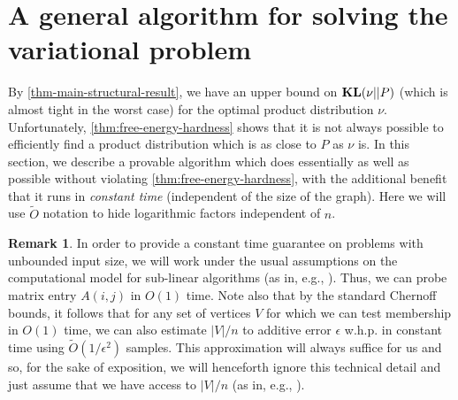\documentclass[final, 12pt]{colt2018}
\newcommand{\KL}{\mathop{\bf KL\/}}
\theoremstyle{definition}
\newtheorem{remark}[theorem]{Remark}
\theoremstyle{plain}
\begin{document}
\section{A general algorithm for solving the variational problem}
By \cref{thm-main-structural-result}, we have an upper bound on $\KL(\nu || P)$ (which is almost tight in the worst case) for the optimal product distribution $\nu$. Unfortunately, \cref{thm:free-energy-hardness} shows that it is not always possible to efficiently find a product distribution which is as close to $P$ as $\nu$ is. In this section, we describe a provable algorithm which does essentially as well as possible without violating \cref{thm:free-energy-hardness}, with the additional benefit that it runs in \emph{constant time} (independent of the size of the graph). Here we will use $\tilde{O}$ notation to hide logarithmic factors independent of $n$.

\begin{remark}
\label{rmk:constant-time-assumptions}
In order to provide a constant time guarantee on problems with unbounded input size, we will work under the usual assumptions on the computational model for sub-linear algorithms (as in, e.g., \citet{alon-etal-samplingCSP-conference,frieze-kannan-matrix,indyk1999sublinear}). Thus, we can probe matrix entry $A(i,j)$ in $O(1)$ time. Note also that by the standard Chernoff bounds, it follows that for any set of vertices $V$ for which we can test membership in $O(1)$ time, we can also estimate $|V|/n$ to additive error $\epsilon$ w.h.p. in constant time using $\tilde{O}(1/\epsilon^2)$ samples. This approximation will always suffice for us and so, for the sake of exposition, we will henceforth ignore this technical detail and just assume that we have access to $|V|/n$ (as in, e.g., \citet{frieze-kannan-matrix}).

\end{remark}
\end{document}
